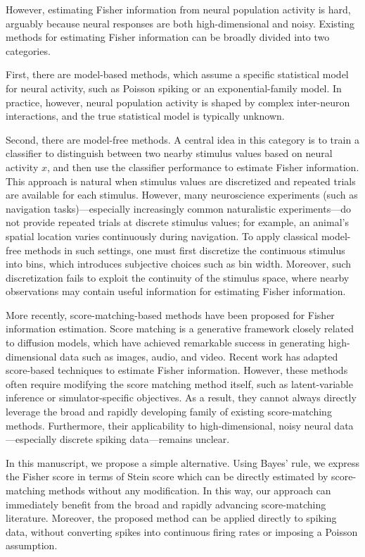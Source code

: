 However, estimating Fisher information from neural population activity is hard, arguably because neural responses are both high-dimensional and noisy. Existing methods for estimating Fisher information can be broadly divided into two categories.

First, there are model-based methods, which assume a specific statistical model for neural activity, such as Poisson spiking or an exponential-family model. In practice, however, neural population activity is shaped by complex inter-neuron interactions, and the true statistical model is typically unknown.

Second, there are model-free methods. A central idea in this category is to train a classifier to distinguish between two nearby stimulus values based on neural activity $x$, and then use the classifier performance to estimate Fisher information. This approach is natural when stimulus values are discretized and repeated trials are available for each stimulus. However, many neuroscience experiments (such as navigation tasks)---especially increasingly common naturalistic experiments---do not provide repeated trials at discrete stimulus values; for example, an animal's spatial location varies continuously during navigation. To apply classical model-free methods in such settings, one must first discretize the continuous stimulus into bins, which introduces subjective choices such as bin width. Moreover, such discretization fails to exploit the continuity of the stimulus space, where nearby observations may contain useful information for estimating Fisher information.

More recently, score-matching-based methods have been proposed for Fisher information estimation. Score matching is a generative framework closely related to diffusion models, which have achieved remarkable success in generating high-dimensional data such as images, audio, and video. Recent work has adapted score-based techniques to estimate Fisher information. However, these methods often require modifying the score matching method itself, such as latent-variable inference or simulator-specific objectives. As a result, they cannot always directly leverage the broad and rapidly developing family of existing score-matching methods. Furthermore, their applicability to high-dimensional, noisy neural data---especially discrete spiking data---remains unclear.

In this manuscript, we propose a simple alternative. Using Bayes' rule, we express the Fisher score in terms of Stein score which can be directly estimated by score-matching methods without any modification. In this way, our approach can immediately benefit from the broad and rapidly advancing score-matching literature. Moreover, the proposed method can be applied directly to spiking data, without converting spikes into continuous firing rates or imposing a Poisson assumption.

